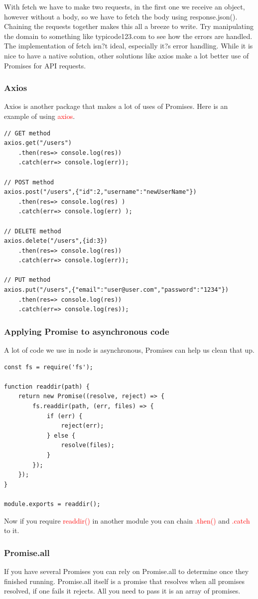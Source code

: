 \documentclass[a4paper]{article}
\begin{document}
With fetch we have to make two requests, in the first one we receive an object, however without a body, so we have to fetch the body using response.json(). Chaining the requests together makes this all a breeze to write. 
Try manipulating the domain to something like typicode123.com to see how the errors are handled.
\\
The implementation of fetch isn?t ideal, especially it?s error handling. While it is nice to have a native solution, other solutions like axios make a lot better use of Promises for API requests.

\subsubsection{Axios}
Axios is another package that makes a lot of uses of Promises. Here is an example of using \textcolor{red}{axios}.
\begin{lstlisting}
// GET method
axios.get("/users")
    .then(res=> console.log(res))
    .catch(err=> console.log(err));

// POST method
axios.post("/users",{"id":2,"username":"newUserName"})
    .then(res=> console.log(res) )
    .catch(err=> console.log(err) );

// DELETE method
axios.delete("/users",{id:3})
    .then(res=> console.log(res))
    .catch(err=> console.log(err));

// PUT method
axios.put("/users",{"email":"user@user.com","password":"1234"})
    .then(res=> console.log(res))
    .catch(err=> console.log(res));
\end{lstlisting}
\subsubsection{Applying Promise to asynchronous code}
A lot of code we use in node is asynchronous, Promises can help us clean that up.
\begin{lstlisting}
const fs = require('fs');

function readdir(path) {
    return new Promise((resolve, reject) => {
        fs.readdir(path, (err, files) => {
            if (err) {
                reject(err);
            } else {
                resolve(files);
            }
        });
    });
}

module.exports = readdir();
\end{lstlisting}
Now if you require \textcolor{red}{readdir()} in another module you can chain  \textcolor{red}{.then()} and  \textcolor{red}{.catch} to it.
\subsubsection{Promise.all}
If you have several Promises you can rely on Promise.all to determine once they finished running. Promise.all itself is a promise that resolves when all promises resolved, if one fails it rejects. All you need to pass it is an array of promises.
\end{document}
